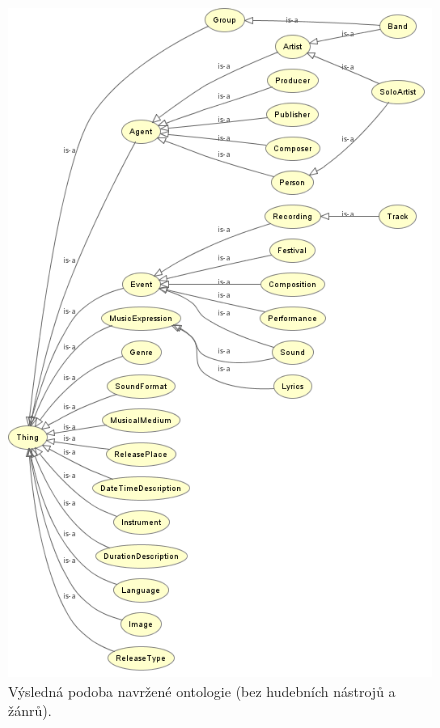 \begin{figure}[h]
\begin{center}
\includegraphics[width=13cm]{figures/mpo_without_genres_instruments}
\caption{Výsledná podoba navržené ontologie (bez hudebních nástrojů a žánrů).}
\label{img:ontoFinal}
\end{center}
\end{figure}

